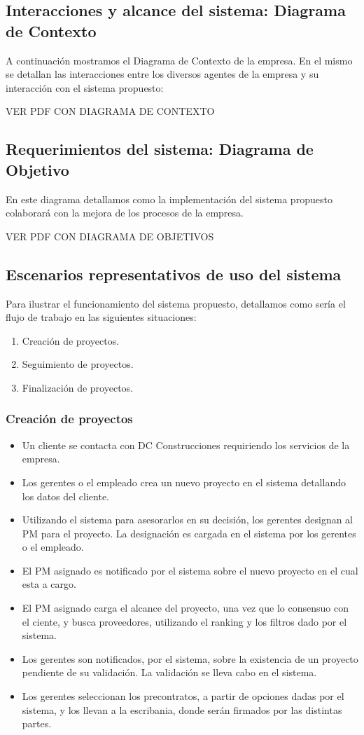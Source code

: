 \subsection{Interacciones y alcance del sistema: Diagrama de Contexto}
A continuación mostramos el Diagrama de Contexto de la empresa. En el mismo se detallan las interacciones entre los diversos agentes de la empresa y su interacción con el sistema propuesto:

VER PDF CON DIAGRAMA DE CONTEXTO

\subsection{Requerimientos del sistema: Diagrama de Objetivo}
En este diagrama detallamos como la implementación del sistema propuesto colaborará con la mejora de los procesos de la empresa.

VER PDF CON DIAGRAMA DE OBJETIVOS

\subsection{Escenarios representativos de uso del sistema}
Para ilustrar el funcionamiento del sistema propuesto, detallamos como sería el flujo de trabajo en las siguientes situaciones:
\begin{enumerate}
    \item Creación de proyectos.
    \item Seguimiento de proyectos.
    \item Finalización de proyectos.
\end{enumerate}

\subsubsection{Creación de proyectos}
\begin{itemize}
    \item Un cliente se contacta con DC Construcciones requiriendo los servicios de la empresa.
    \item Los gerentes o el empleado crea un nuevo proyecto en el sistema detallando los datos del cliente.
    \item Utilizando el sistema para asesorarlos en su decisión, los gerentes designan al PM para el proyecto. La designación es cargada en el sistema por los gerentes o el empleado.
    \item El PM asignado es notificado por el sistema sobre el nuevo proyecto en el cual esta a cargo.
    \item El PM asignado carga el alcance del proyecto, una vez que lo consensuo con el ciente, y busca proveedores, utilizando el ranking y los filtros dado por el sistema.
    \item Los gerentes son notificados, por el sistema, sobre la existencia de un proyecto pendiente de su validación. La validación se lleva cabo en el sistema.
    \item Los gerentes seleccionan los precontratos, a partir de opciones dadas por el sistema, y los llevan a la escribania, donde serán firmados por las distintas partes.     
\end{itemize}

